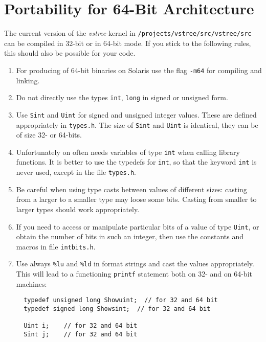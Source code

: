 \documentclass[12pt]{article}
\begin{document}
\section{Portability for 64-Bit Architecture}
\label{SixtyfourBits}
The current version of the \emph{vstree}-kernel in 
\texttt{/projects/vstree/src/vstree/src} can be compiled in 32-bit or in
64-bit mode.
If you stick to the following rules, this should also be possible for your code. 
\begin{enumerate}
\item For producing of 64-bit binaries on Solaris use the flag \texttt{-m64} 
      for compiling and linking.

\item
Do not directly use the types \texttt{int}, \texttt{long} in signed or
unsigned form.
\item
Use \texttt{Sint} and \texttt{Uint} for signed and unsigned integer values. These are defined
appropriately in \texttt{types.h}. The size of \texttt{Sint} and \texttt{Uint} is identical, they
can be of size 32- or 64-bits. 
\item
Unfortunately on often needs variables of type \texttt{int} when calling library
functions. It is better to use the typedefs for \texttt{int}, so that the keyword \texttt{int} is never used, except in the file \texttt{types.h}.

\item 
Be careful when using type casts between values of different sizes:
casting from a larger to a smaller type may loose some bits.
Casting from smaller to larger types should work appropriately.
\item
If you need to access or manipulate particular bits of a value of type
\texttt{Uint}, or obtain the number of bits in such an
integer, then use the constants and macros
in file \texttt{intbits.h}.

\item Use always \texttt{\%lu} and \texttt{\%ld} in format strings and cast
the values appropriately. This will lead to a functioning \texttt{printf} statement both on 32- and on 64-bit machines:

\begin{footnotesize}
\begin{verbatim}
  typedef unsigned long Showuint;  // for 32 and 64 bit
  typedef signed long Showsint;  // for 32 and 64 bit

  Uint i;    // for 32 and 64 bit
  Sint j;    // for 32 and 64 bit


\end{verbatim}
\end{footnotesize}
\end{enumerate}
\end{document}

